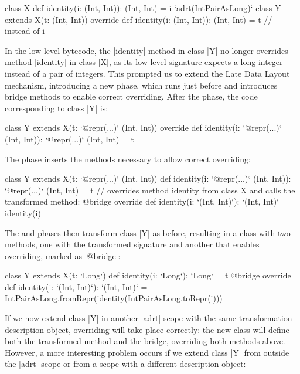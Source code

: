 \begin{lstlisting-nobreak}
class X {
  def identity(i: (Int, Int)): (Int, Int) = i
}
`adrt(IntPairAsLong)` {
  class Y extends X(t: (Int, Int)) {
    override def identity(i: (Int, Int)): (Int, Int) = t // instead of i
  }
}
\end{lstlisting-nobreak}

In the low-level bytecode, the |identity| method in class |Y| no longer overrides method |identity| in class |X|, as its low-level signature expects a long integer instead of a pair of integers. This prompted us to extend the Late Data Layout mechanism, introducing a new \bridge{} phase, which runs just before \coerce{} and introduces bridge methods to enable correct overriding. After the \inject{} phase, the code corresponding to class |Y| is:

\begin{lstlisting-nobreak}
class Y extends X(t: `@repr(...)` (Int, Int)) {
  override def identity(i: `@repr(...)` (Int, Int)): `@repr(...)` (Int, Int) = t
}
\end{lstlisting-nobreak}

The \bridge{} phase inserts the methods necessary to allow correct overriding:

\begin{lstlisting-nobreak}
class Y extends X(t: `@repr(...)` (Int, Int)) {
  def identity(i: `@repr(...)` (Int, Int)): `@repr(...)` (Int, Int) = t
  // overrides method identity from class X and calls the transformed method:
  @bridge override def identity(i: `(Int, Int)`): `(Int, Int)` = identity(i)
}
\end{lstlisting-nobreak}

The \coerce{} and \commit{} phases then transform class |Y| as before, resulting in a class with two methods, one with the transformed signature and another that enables overriding, marked as |@bridge|:

\begin{lstlisting-nobreak}
class Y extends X(t: `Long`) {
  def identity(i: `Long`): `Long` = t
  @bridge override def identity(i: `(Int, Int)`): `(Int, Int)` =
    IntPairAsLong.fromRepr(identity(IntPairAsLong.toRepr(i)))
}
\end{lstlisting-nobreak}

If we now extend class |Y| in another |adrt| scope with the same transformation description object, overriding will take place correctly: the new class will define both the transformed method and the bridge, overriding both methods above. However, a more interesting problem occurs if we extend class |Y| from outside the |adrt| scope or from a scope with a different description object:

